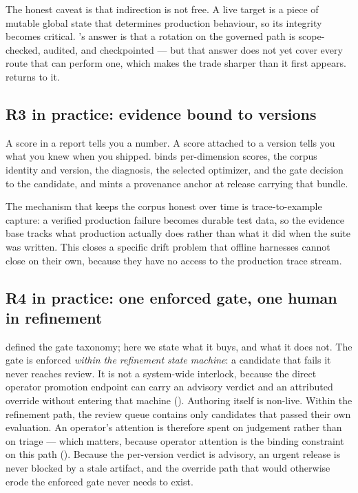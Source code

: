 The honest caveat is that indirection is not free. A live target is a piece of
mutable global state that determines production behaviour, so its integrity becomes
critical. \sys's answer is that a rotation on the governed path is scope-checked,
audited, and checkpointed --- but that answer does not yet cover every route that
can perform one, which makes the trade sharper than it first appears.
 returns to it.

\subsection{R3 in practice: evidence bound to versions}

A score in a report tells you a number. A score attached to a version tells you
what you knew when you shipped. \sys binds per-dimension scores, the corpus
identity and version, the diagnosis, the selected optimizer, and the gate decision
to the candidate, and mints a provenance anchor at release carrying that bundle.

The mechanism that keeps the corpus honest over time is trace-to-example capture: a
verified production failure becomes durable test data, so the evidence base tracks
what production actually does rather than what it did when the suite was written.
This closes a specific drift problem that offline harnesses cannot close on their
own, because they have no access to the production trace stream.

\subsection{R4 in practice: one enforced gate, one human in refinement}

 defined the gate taxonomy; here we state what it buys, and
what it does not. The gate is enforced \emph{within the refinement state machine}:
a candidate that fails it never reaches review. It is not a system-wide interlock,
because the direct operator promotion endpoint can carry an advisory verdict and
an attributed override without entering that machine ().
Authoring itself is non-live. Within the refinement path, the review
queue contains only candidates that passed their own evaluation. An operator's attention is therefore
spent on judgement rather than on triage --- which matters, because operator
attention is the binding constraint on this path (). Because the
per-version verdict is advisory, an urgent release is never blocked by a stale
artifact, and the override path that would otherwise erode the enforced gate never
needs to exist.

